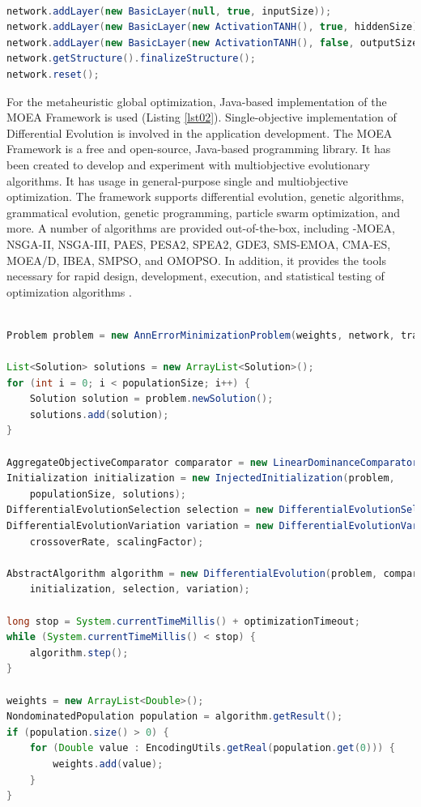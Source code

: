 \documentclass[a4paper,conference]{IEEEtran}
\begin{document}
\begin{lstlisting}[caption=Building artificial neural network, language=Java, basicstyle=\tiny, label=lst01]

network.addLayer(new BasicLayer(null, true, inputSize));
network.addLayer(new BasicLayer(new ActivationTANH(), true, hiddenSize));
network.addLayer(new BasicLayer(new ActivationTANH(), false, outputSize));
network.getStructure().finalizeStructure();
network.reset();

\end{lstlisting}

For the metaheuristic global optimization, Java-based implementation of the MOEA Framework is used (Listing \ref{lst02}). Single-objective implementation of Differential Evolution is involved in the application development. The MOEA Framework is a free and open-source, Java-based programming library. It has been created to develop and experiment with multiobjective evolutionary algorithms. It has usage in general-purpose single and multiobjective optimization. The framework supports differential evolution, genetic algorithms, grammatical evolution, genetic programming, particle swarm optimization, and more. A number of algorithms are provided out-of-the-box, including \varepsilon -MOEA, NSGA-II, NSGA-III, PAES, PESA2, SPEA2, GDE3, SMS-EMOA, CMA-ES, MOEA/D, IBEA, SMPSO, and OMOPSO. In addition, it provides the tools necessary for rapid design, development, execution, and statistical testing of optimization algorithms \cite{Hadka-01}.

\begin{lstlisting}[caption=Differential Evolution training, language=Java, basicstyle=\tiny, label=lst02]

Problem problem = new AnnErrorMinimizationProblem(weights, network, train);

List<Solution> solutions = new ArrayList<Solution>();
for (int i = 0; i < populationSize; i++) {
    Solution solution = problem.newSolution();
    solutions.add(solution);
}

AggregateObjectiveComparator comparator = new LinearDominanceComparator();
Initialization initialization = new InjectedInitialization(problem, 
    populationSize, solutions);
DifferentialEvolutionSelection selection = new DifferentialEvolutionSelection();
DifferentialEvolutionVariation variation = new DifferentialEvolutionVariation(
    crossoverRate, scalingFactor);

AbstractAlgorithm algorithm = new DifferentialEvolution(problem, comparator, 
    initialization, selection, variation);

long stop = System.currentTimeMillis() + optimizationTimeout;
while (System.currentTimeMillis() < stop) {
    algorithm.step();
}

weights = new ArrayList<Double>();
NondominatedPopulation population = algorithm.getResult();
if (population.size() > 0) {
    for (Double value : EncodingUtils.getReal(population.get(0))) {
        weights.add(value);
    }
}

\end{lstlisting}
\end{document}
